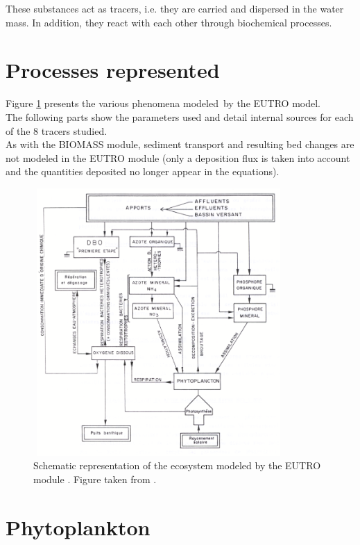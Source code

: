 These substances act as tracers,
i.e. they are carried and dispersed in the water mass.
In addition, they react with each other through biochemical processes.

\section{Processes represented}

Figure \ref{ecosyst_scheme} presents the various phenomena modeled\ by the EUTRO model.\\

The following parts show the parameters used and detail internal sources for each of the 8 tracers studied.\\

As with the BIOMASS module, sediment transport and resulting bed changes
are not modeled in the EUTRO module
(only a deposition flux is taken into account and the quantities deposited no longer appear in the equations).\\

\begin{figure}[H]
  \centering
  \includegraphics[width=3.76in,height=4.01in]{graphics/image38.png}
  \caption{Schematic representation of the ecosystem modeled by the EUTRO module \cite{gosse_doubs_1989}.
    Figure taken from \cite{elkadi_tracer_2012}.}
  \label{ecosyst_scheme}
\end{figure}

\section{Phytoplankton}

